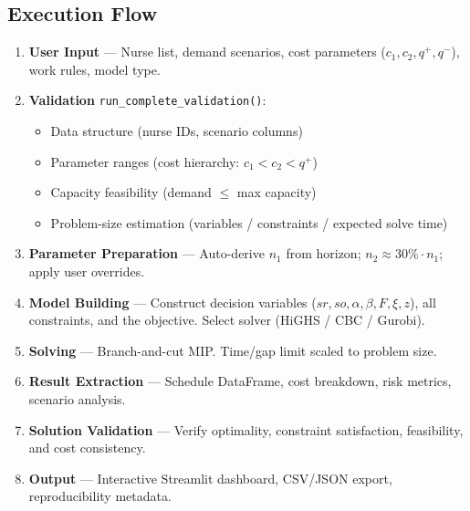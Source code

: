 \documentclass[12pt,a4paper]{article}
\begin{document}
\subsection{Execution Flow}

\begin{enumerate}[leftmargin=20pt, itemsep=6pt,
    label=\colorbox{navyblue}{\color{white}\small\bfseries\arabic*.}]

  \item \textbf{User Input} — Nurse list, demand scenarios, cost parameters ($c_1,c_2,q^+,q^-$), work rules, model type.

  \item \textbf{Validation} \texttt{run\_complete\_validation()}:
    \begin{itemize}[itemsep=2pt]
      \item Data structure (nurse IDs, scenario columns)
      \item Parameter ranges (cost hierarchy: $c_1 < c_2 < q^+$)
      \item Capacity feasibility (demand $\leq$ max capacity)
      \item Problem-size estimation (variables / constraints / expected solve time)
    \end{itemize}

  \item \textbf{Parameter Preparation} — Auto-derive $n_1$ from horizon; $n_2 \approx 30\% \cdot n_1$; apply user overrides.

  \item \textbf{Model Building} — Construct decision variables ($sr, so, \alpha, \beta, F, \xi, z$), all constraints, and the objective. Select solver (HiGHS / CBC / Gurobi).

  \item \textbf{Solving} — Branch-and-cut MIP. Time/gap limit scaled to problem size.

  \item \textbf{Result Extraction} — Schedule DataFrame, cost breakdown, risk metrics, scenario analysis.

  \item \textbf{Solution Validation} — Verify optimality, constraint satisfaction, feasibility, and cost consistency.

  \item \textbf{Output} — Interactive Streamlit dashboard, CSV/JSON export, reproducibility metadata.
\end{enumerate}

\newpage
\end{document}
